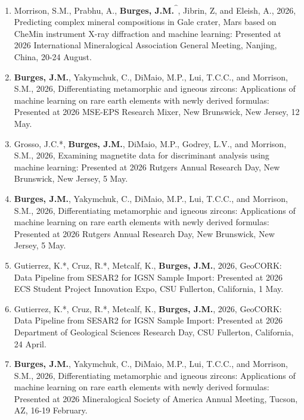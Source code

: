 \documentclass{res} %
\begin{document}
\begin{resume}
\begin{enumerate}
\item Morrison, S.M., Prabhu, A., \textbf{Burges, J.M.\textsuperscript{\textasciicircum}}, Jibrin, Z, and Eleish, A., 2026, Predicting complex mineral compositions in Gale crater, Mars based on CheMin instrument X-ray diffraction and machine learning: Presented at 2026 International Mineralogical Association General Meeting, Nanjing, China, 20-24 August.

\item \textbf{Burges, J.M.}, Yakymchuk, C., DiMaio, M.P., Lui, T.C.C., and Morrison, S.M., 2026, Differentiating metamorphic and igneous zircons: Applications of machine learning on rare earth elements with newly derived formulas: Presented at 2026 MSE-EPS Research Mixer, New Brunswick, New Jersey, 12 May.

\item Grosso, J.C.*, \textbf{Burges, J.M.}, DiMaio, M.P., Godrey, L.V., and Morrison, S.M., 2026, Examining magnetite data for discriminant analysis using machine learning: Presented at 2026 Rutgers Annual Research Day, New Brunswick, New Jersey, 5 May.

\item \textbf{Burges, J.M.}, Yakymchuk, C., DiMaio, M.P., Lui, T.C.C., and Morrison, S.M., 2026, Differentiating metamorphic and igneous zircons: Applications of machine learning on rare earth elements with newly derived formulas: Presented at 2026 Rutgers Annual Research Day, New Brunswick, New Jersey, 5 May.

\item Gutierrez, K.*, Cruz, R.*, Metcalf, K., \textbf{Burges, J.M.}, 2026, GeoCORK: Data Pipeline from SESAR2 for IGSN Sample Import: Presented at 2026 ECS Student Project Innovation Expo, CSU Fullerton, California, 1 May.

\item Gutierrez, K.*, Cruz, R.*, Metcalf, K., \textbf{Burges, J.M.}, 2026, GeoCORK: Data Pipeline from SESAR2 for IGSN Sample Import: Presented at 2026 Department of Geological Sciences Research Day, CSU Fullerton, California, 24 April.

\item \textbf{Burges, J.M.}, Yakymchuk, C., DiMaio, M.P., Lui, T.C.C., and Morrison, S.M., 2026, Differentiating metamorphic and igneous zircons: Applications of machine learning on rare earth elements with newly derived formulas: Presented at 2026 Mineralogical Society of America Annual Meeting, Tucson, AZ, 16-19 February.


\end{enumerate}
\end{resume}
\end{document}
